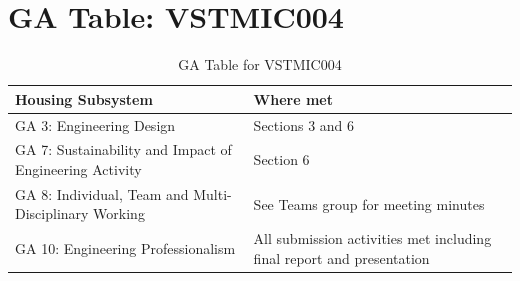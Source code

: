 \documentclass[class=report,11pt,crop=false]{standalone}
\begin{document}
	\section{GA Table: VSTMIC004}
		\begin{table}[h!]
		\centering
		\caption{GA Table for VSTMIC004}
		\begin{tabularx}{0.8\textwidth}
			{ 
				| >{\centering\arraybackslash}X 
				| >{\centering\arraybackslash}X |}
			\hline
			\textbf{Housing Subsystem} & \textbf{Where met}                                                    \\ \hline
			GA 3: Engineering Design                                                                                               & Sections 3 and 6                                                      \\ \hline
			GA 7: Sustainability and Impact of Engineering Activity                                                                & Section 6                                                             \\ \hline
			GA 8: Individual, Team and Multi-Disciplinary Working                                                                  & See Teams group for meeting minutes                                   \\ \hline
			GA 10: Engineering Professionalism                                                                                     & All submission activities met including final report and presentation \\ \hline
		\end{tabularx}
		\label{tab:A6}
	\end{table}
	\ifstandalone
	
	\printnoidxglossary[type=\acronymtype,nonumberlist]
	\fi
\end{document}

